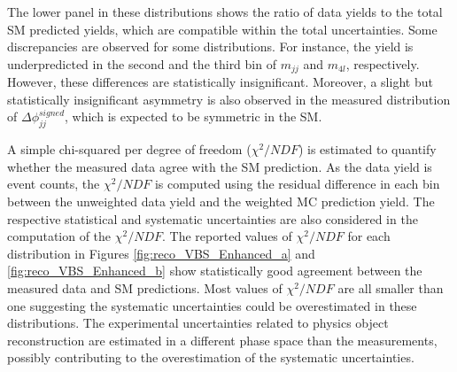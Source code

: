 The lower panel in these distributions shows the ratio of data yields to the total SM predicted yields, which are compatible within the total uncertainties. Some discrepancies are observed for some distributions. For instance, the yield is underpredicted in the second and the third bin of $m_{jj}$ and $m_{4l}$, respectively. However, these differences are statistically insignificant. Moreover, a slight but statistically insignificant asymmetry is also observed in the measured distribution of $\Delta \phi _{jj}^{signed}$, which is expected to be symmetric in the SM. 

A simple chi-squared per degree of freedom ($\chi^2/NDF$) is estimated to quantify whether the measured data agree with the SM prediction. As the data yield is event counts, the $\chi^2/NDF$ is computed using the residual difference in each bin between the unweighted data yield and the weighted MC prediction yield. The respective statistical and systematic uncertainties are also considered in the computation of the $\chi^2/NDF$. The reported values of $\chi^2/NDF$ for each distribution in Figures \ref{fig:reco_VBS_Enhanced_a} and \ref{fig:reco_VBS_Enhanced_b} show statistically good agreement between the measured data and SM predictions. Most values of $\chi^2/NDF$ are all smaller than one suggesting the systematic uncertainties could be overestimated in these distributions. The experimental uncertainties related to physics object reconstruction are estimated in a different phase space than the measurements, possibly contributing to the overestimation of the systematic uncertainties. 

